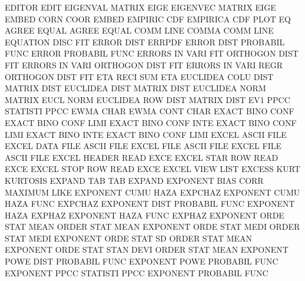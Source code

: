 EDITOR                                  EDIT
EIGENVAL                                MATRIX   EIGE
EIGENVEC                                MATRIX   EIGE
EMBED    CORN COOR                      EMBED
EMPIRIC  CDF                            EMPIRICA CDF  PLOT
EQ                                      AGREE
EQUAL                                   AGREE
EQUAL    COMM LINE                      COMMA    COMM LINE
EQUATION DISC                           FIT
ERROR    DIST                           ERRPDF
ERROR    DIST                           PROBABIL FUNC
ERROR                                   PROBABIL FUNC
ERRORS   IN   VARI FIT                  ORTHOGON DIST FIT
ERRORS   IN   VARI                      ORTHOGON DIST FIT
ERRORS   IN   VARI REGR                 ORTHOGON DIST FIT
ETA      RECI SUM                       ETA
EUCLIDEA COLU DIST                      MATRIX   DIST
EUCLIDEA DIST                           MATRIX   DIST
EUCLIDEA NORM                           MATRIX   EUCL NORM
EUCLIDEA ROW  DIST                      MATRIX   DIST
EV1      PPCC                           STATISTI PPCC
EWMA     CHAR                           EWMA     CONT CHAR
EXACT    BINO CONF                      EXACT    BINO CONF LIMI
EXACT    BINO CONF INTE                 EXACT    BINO CONF LIMI
EXACT    BINO INTE                      EXACT    BINO CONF LIMI
EXCEL                                   ASCII    FILE
EXCEL    DATA FILE                      ASCII    FILE
EXCEL    FILE                           ASCII    FILE
EXCEL    FILE                           ASCII    FILE
EXCEL    HEADER                         READ     EXCE
EXCEL    STAR ROW                       READ     EXCE
EXCEL    STOP ROW                       READ     EXCE
EXCEL    VIEW                           LIST
EXCESS   KURT                           KURTOSIS
EXPAND   TAB                            TAB      EXPAND
EXPONENT BIAS CORR                      MAXIMUM  LIKE
EXPONENT CUMU HAZA                      EXPCHAZ
EXPONENT CUMU HAZA FUNC                 EXPCHAZ
EXPONENT DIST                           PROBABIL FUNC
EXPONENT HAZA                           EXPHAZ
EXPONENT HAZA FUNC                      EXPHAZ
EXPONENT ORDE STAT MEAN                 ORDER    STAT MEAN
EXPONENT ORDE STAT MEDI                 ORDER    STAT MEDI
EXPONENT ORDE STAT SD                   ORDER    STAT MEAN
EXPONENT ORDE STAT STAN DEVI            ORDER    STAT MEAN
EXPONENT POWE DIST                      PROBABIL FUNC
EXPONENT POWE                           PROBABIL FUNC
EXPONENT PPCC                           STATISTI PPCC
EXPONENT                                PROBABIL FUNC
